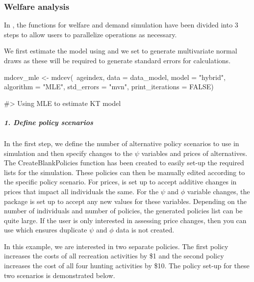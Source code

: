 \hypertarget{welfare-analysis}{%
\subsubsection{Welfare analysis}\label{welfare-analysis}}

In , the functions for welfare and demand simulation have
been divided into 3 steps to allow users to parallelize operations as
necessary.

We first estimate the model using  and we set
 to generate multivariate normal draws as
these will be required to generate standard errors for calculations.

\begin{Schunk}
\begin{Sinput}
mdcev_mle <- mdcev(~ageindex,
                  data = data_model,
                  model = "hybrid",
                  algorithm = "MLE",
                  std_errors = "mvn",
                  print_iterations = FALSE)
\end{Sinput}
\begin{Soutput}
#> Using MLE to estimate KT model
\end{Soutput}
\end{Schunk}

\hypertarget{define-policy-scenarios}{%
\subparagraph{1. Define policy
scenarios}\label{define-policy-scenarios}}

In the first step, we define the number of alternative policy scenarios
to use in simulation and then specify changes to the \(\psi\) variables
and prices of alternatives. The CreateBlankPolicies function has been
created to easily set-up the required lists for the simulation. These
policies can then be manually edited according to the specific policy
scenario. For prices,  is set up to accept additive changes
in prices that impact all individuals the same. For the \(\psi\) and
\(\phi\) variable changes, the package is set up to accept any new
values for these variables. Depending on the number of individuals and
number of policies, the generated policies list can be quite large. If
the user is only interested in assessing price changes, then you can use
 which ensures duplicate \(\psi\) and
\(\phi\) data is not created.

In this example, we are interested in two separate policies. The first
policy increases the costs of all recreation activities by \$1 and the
second policy increases the cost of all four hunting activities by \$10.
The policy set-up for these two scenarios is demonstrated below.

